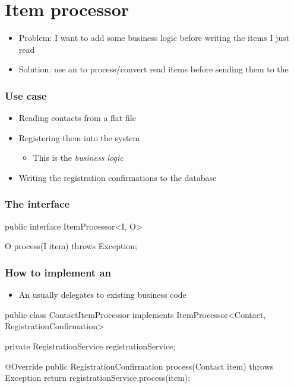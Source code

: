 \section{Item processor}

\begin{frame}
 \begin{itemize}
  \item Problem: I want to add some business logic before writing the items I just read
  \item Solution: use an  to process/convert read items 
  before sending them to the 
 \end{itemize}
\end{frame}

\begin{frame}
 \frametitle{Use case}
 \begin{itemize}
  \item Reading contacts from a flat file
  \item Registering them into the system
  \begin{itemize}
    \item This is the \em business logic
  \end{itemize}
  \item Writing the registration confirmations to the database
 \end{itemize}
\end{frame}


\begin{frame}[fragile]
\frametitle{The  interface}
\begin{javacode}
public interface ItemProcessor<I, O> {

  O process(I item) throws Exception;

}
\end{javacode}
\end{frame}

\begin{frame}[fragile]
\frametitle{How to implement an }
\begin{itemize}
 \item An  usually delegates to existing business code
\end{itemize}

\begin{javacode}
public class ContactItemProcessor implements
             ItemProcessor<Contact, RegistrationConfirmation> {

  private RegistrationService registrationService;

  @Override
  public RegistrationConfirmation process(Contact item)
       throws Exception {
     return registrationService.process(item);
  }

}
\end{javacode}
\end{frame}

